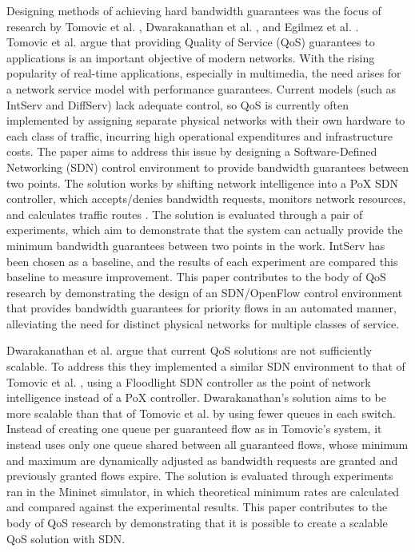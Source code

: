 \documentclass[accepted,single]{gipaper}
\begin{document}
Designing methods of achieving hard bandwidth guarantees was the focus of research by Tomovic et al. \cite{Tomovic:2014}, Dwarakanathan et al. \cite{Dwara:2015}, and Egilmez et al. \cite{Egil}.
\\


\hspace{10mm} Tomovic et al. \cite{Tomovic:2014} argue that providing Quality of Service (QoS) guarantees to applications is an important objective of modern networks. With the rising popularity of real-time applications, especially in multimedia, the need arises for a network service model with performance guarantees. Current models (such as IntServ and DiffServ) lack adequate control, so QoS is currently often implemented by assigning separate physical networks with their own hardware to each class of traffic, incurring high operational expenditures and infrastructure costs. The paper aims to address this issue by designing a Software-Defined Networking (SDN) control environment to provide bandwidth guarantees between two points. The solution works by shifting network intelligence into a PoX SDN controller, which accepts/denies bandwidth requests, monitors network resources, and calculates traffic routes \cite{Tomovic:2014}. The solution is evaluated through a pair of experiments, which aim to demonstrate that the system can actually provide the minimum bandwidth guarantees between two points in the work. IntServ has been chosen as a baseline, and the results of each experiment are compared this baseline to measure improvement. This paper contributes to the body of QoS research by demonstrating the design of an SDN/OpenFlow control environment that provides bandwidth guarantees for priority flows in an automated manner, alleviating the need for distinct physical networks for multiple classes of service.


\hspace{10mm} Dwarakanathan et al. \cite{Dwara:2015} argue that current QoS solutions are not sufficiently scalable. To address this they implemented a similar SDN environment to that of Tomovic et al. \cite{Tomovic:2014}, using a Floodlight SDN controller as the point of network intelligence instead of a PoX controller. Dwarakanathan's \cite{Dwara:2015} solution aims to be more scalable than that of Tomovic et al. \cite{Tomovic:2014} by using fewer queues in each switch. Instead of creating one queue per guaranteed flow as in Tomovic's \cite{Tomovic:2014} system, it instead uses only one queue shared between all guaranteed flows, whose minimum and maximum are dynamically adjusted as bandwidth requests are granted and previously granted flows expire. The solution is evaluated through experiments ran in the Mininet simulator, in which theoretical minimum rates are calculated and compared against the experimental results. This paper contributes to the body of QoS research by demonstrating that it is possible to create a scalable QoS solution with SDN.
\end{document}
